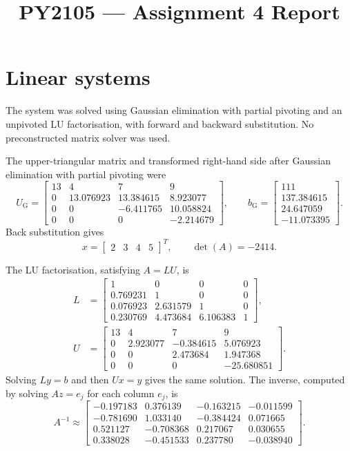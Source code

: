 \documentclass[11pt,a4paper]{article}
\title{PY2105 --- Assignment 4 Report}
\author{}
\date{}
\begin{document}
\maketitle

\section{Linear systems}
The system was solved using Gaussian elimination with partial pivoting and an
unpivoted LU factorisation, with forward and backward substitution. No
preconstructed matrix solver was used.

The upper-triangular matrix and transformed right-hand side after Gaussian
elimination with partial pivoting were
\[
U_{\mathrm{G}}=
\begin{bmatrix}
13&4&7&9\\
0&13.076923&13.384615&8.923077\\
0&0&-6.411765&10.058824\\
0&0&0&-2.214679
\end{bmatrix},\qquad
b_{\mathrm{G}}=
\begin{bmatrix}
111\\137.384615\\24.647059\\-11.073395
\end{bmatrix}.
\]
Back substitution gives
\[
x=\begin{bmatrix}2&3&4&5\end{bmatrix}^{T},
\qquad \det(A)=-2414.
\]

The LU factorisation, satisfying \(A=LU\), is
\[
\begin{aligned}
L&=
\begin{bmatrix}
1&0&0&0\\
0.769231&1&0&0\\
0.076923&2.631579&1&0\\
0.230769&4.473684&6.106383&1
\end{bmatrix},\\[1ex]
U&=
\begin{bmatrix}
13&4&7&9\\
0&2.923077&-0.384615&5.076923\\
0&0&2.473684&1.947368\\
0&0&0&-25.680851
\end{bmatrix}.
\end{aligned}
\]
Solving \(Ly=b\) and then \(Ux=y\) gives the same solution. The inverse,
computed by solving \(A z=e_j\) for each column \(e_j\), is
\[
A^{-1}\approx
\begin{bmatrix}
-0.197183&0.376139&-0.163215&-0.011599\\
-0.781690&1.033140&-0.384424&0.071665\\
0.521127&-0.708368&0.217067&0.030655\\
0.338028&-0.451533&0.237780&-0.038940
\end{bmatrix}.
\]
\end{document}
